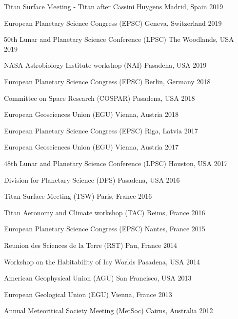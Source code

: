 
\begin{cvhonors}

    \cvhonor
    {Titan Surface Meeting - Titan after Cassini Huygens}
    {}
    {Madrid, Spain}
    {2019}

    \cvhonor
    {European Planetary Science Congress (EPSC)}
    {}
    {Geneva, Switzerland}
    {2019}

    \cvhonor
    {50th Lunar and Planetary Science Conference (LPSC)}
    {}
    {The Woodlands, USA}
    {2019}

    \cvhonor
    {NASA Astrobiology Institute workshop (NAI)}
    {}
    {Pasadena, USA}
    {2019}

    \cvhonor
    {European Planetary Science Congress (EPSC)}
    {}
    {Berlin, Germany}
    {2018}

    \cvhonor
    {Committee on Space Research (COSPAR)}
    {}
    {Pasadena, USA}
    {2018}

    \cvhonor
    {European Geosciences Union (EGU)}
    {}
    {Vienna, Austria}
    {2018}

    \cvhonor
    {European Planetary Science Congress (EPSC)}
    {}
    {Riga, Latvia}
    {2017}

  \cvhonor
    {European Geosciences Union (EGU)}
    {}
    {Vienna, Austria}
    {2017}

  \cvhonor
    {48th Lunar and Planetary Science Conference (LPSC)}
    {}
    {Houston, USA}
    {2017}

\end{cvhonors}
\begin{cvhonors}

  \cvhonor
    {Division for Planetary Science (DPS)}
    {}
    {Pasadena, USA}
    {2016}

  \cvhonor
    {Titan Surface Meeting (TSW)}
    {}
    {Paris, France}
    {2016}

    \cvhonor
    {Titan Aeronomy and Climate workshop (TAC)}
    {}
    {Reims, France}
    {2016}

  \cvhonor
    {European Planetary Science Congress (EPSC)}
    {}
    {Nantes, France}
    {2015}

  \cvhonor
    {Reunion des Sciences de la Terre (RST)}
    {}
    {Pau, France}
    {2014}

  \cvhonor
    {Workshop on the Habitability of Icy Worlds}
    {}
    {Pasadena, USA}
    {2014}

  \cvhonor
    {American Geophysical Union (AGU)}
    {}
    {San Francisco, USA}
    {2013}

  \cvhonor
    {European Geological Union (EGU)}
    {}
    {Vienna, France}
    {2013}

  \cvhonor
    {Annual Meteoritical Society Meeting (MetSoc)}
    {}
    {Cairns, Australia}
    {2012}


\end{cvhonors}
